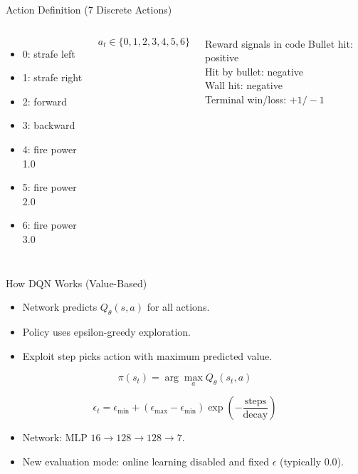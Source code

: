 \documentclass[12pt,aspectratio=169]{beamer}
\begin{document}
\begin{frame}{Action Definition (7 Discrete Actions)}
\begin{columns}[T,totalwidth=\textwidth]
\begin{itemize}
  \item 0: strafe left
  \item 1: strafe right
  \item 2: forward
  \item 3: backward
  \item 4: fire power 1.0
  \item 5: fire power 2.0
  \item 6: fire power 3.0
\end{itemize}

\[
a_t \in \{0,1,2,3,4,5,6\}
\]
\vspace{0.1cm}
\begin{block}{Reward signals in code}
Bullet hit: positive\\
Hit by bullet: negative\\
Wall hit: negative\\
Terminal win/loss: $+1/-1$
\end{block}
\end{columns}
\end{frame}

\begin{frame}{How DQN Works (Value-Based)}
\begin{itemize}
  \item Network predicts $Q_\theta(s,a)$ for all actions.
  \item Policy uses epsilon-greedy exploration.
  \item Exploit step picks action with maximum predicted value.
\end{itemize}

\[
\pi(s_t)=\arg\max_a Q_\theta(s_t,a)
\]

\[
\epsilon_t=\epsilon_{\min}+\left(\epsilon_{\max}-\epsilon_{\min}\right)\exp\left(-\frac{\text{steps}}{\text{decay}}\right)
\]

\begin{itemize}
  \item Network: MLP $16 \rightarrow 128 \rightarrow 128 \rightarrow 7$.
  \item New evaluation mode: online learning disabled and fixed $\epsilon$ (typically $0.0$).
\end{itemize}
\end{frame}
\end{document}
